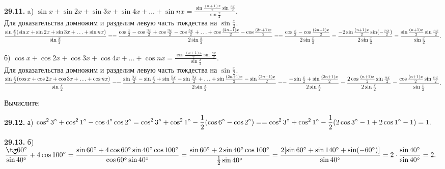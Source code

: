 \documentclass[a5paper,10pt]{article}
\begin{document}
\medskip
\noindent
{\bf 29.11.} a) $\displaystyle \sin x+\sin2x+\sin3x+\sin4x+\ldots+\sin nx=
\frac{\sin\frac{(n+1)x}{2}\sin\frac{nx}{2}}{\sin\frac x2}.$\\
Для доказательства домножим и разделим левую часть тождества на
$\displaystyle \sin\frac x2.$\\[3pt]
$\displaystyle \frac{\sin\frac x2(\sin x+\sin2x+\sin3x+\ldots+\sin nx)}
{\sin\frac x2}=\\[3pt]
=\frac{\cos\frac x2-\cos\frac{3x}{2}+\cos\frac{3x}{2}-\cos\frac{5x}{2}+
\ldots+\cos\frac{(2n-1)x}{2}-\cos\frac{(2n+1)x}{2}}{2\sin\frac x2}=\\[3pt]
=\frac{\cos\frac x2-\cos\frac{(2n+1)x}{2}}{2\sin\frac x2}=
\frac{-2\sin\frac{(n+1)x}{2}\sin(-\frac{nx}{2})}{2\sin\frac x2}=
\frac{\sin\frac{(n+1)x}{2}\sin\frac{nx}{2}}{\sin\frac x2}.$

\medskip
\noindent
б) $\displaystyle \cos x+\cos2x+\cos3x+\cos4x+\ldots+\cos nx=
\frac{\cos\frac{(n+1)x}{2}\sin\frac{nx}{2}}{\sin\frac x2}.$\\
Для доказательства домножим и разделим левую часть тождества на
$\displaystyle \sin\frac x2.$\\[3pt]
$\displaystyle \frac{\sin\frac x2(\cos x+\cos2x+\cos3x+\ldots+\cos nx)}
{\sin\frac x2}=\\[3pt]
=\frac{\sin\frac{3x}{2}-\sin\frac x2+\sin\frac{5x}{2}-\sin\frac{3x}{2}+
\ldots+\sin\frac{(2n+1)x}{2}-\sin\frac{(2n-1)x}{2}}{2\sin\frac x2}=\\[3pt]
=\frac{-\sin\frac x2+\sin\frac{(2n+1)x}{2}}{2\sin\frac x2}=
\frac{2\cos\frac{(n+1)x}{2}\sin\frac{nx}{2}}{2\sin\frac x2}=
\frac{\cos\frac{(n+1)x}{2}\sin\frac{nx}{2}}{\sin\frac x2}.$

\medskip
\noindent
Вычислите:

\medskip
\noindent
{\bf 29.12.} а) $\displaystyle \cos^23^\circ+\cos^21^\circ-\cos4^\circ\cos2^\circ=
\cos^23^\circ+\cos^21^\circ-\frac12(\cos6^\circ-\cos2^\circ)=\\[3pt]
=\cos^23^\circ+\cos^21^\circ-\frac12(2\cos3^\circ-1+2\cos1^\circ-1)=1.$

\medskip
\noindent
{\bf 29.13.} б) $\displaystyle \frac{\tg60^\circ}{\sin40^\circ}+4\cos100^\circ=
\frac{\sin60^\circ+4\cos60^\circ\sin40^\circ\cos100^\circ}{\cos60^\circ\sin40^\circ}=\\[3pt]
\frac{\sin60^\circ+2\sin40^\circ\cos100^\circ}{\frac12\sin40^\circ}=
\frac{2[\sin60^\circ+\sin140^\circ+\sin(-60^\circ)]}
{\sin40^\circ}=2\cdot\frac{\sin40^\circ}{\sin40^\circ}=2.$
\end{document}

